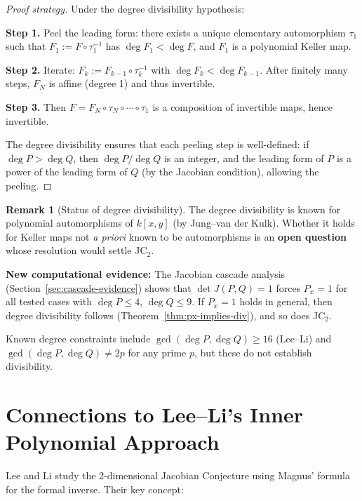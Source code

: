 \documentclass[12pt,a4paper]{article}
\theoremstyle{definition}
\newtheorem{remark}[theorem]{Remark}
\newcommand{\kk}{k}
\begin{document}
\begin{proof}[Proof strategy]
Under the degree divisibility hypothesis:

\textbf{Step 1.} Peel the leading form: there exists a unique elementary automorphism
$\tau_1$ such that $F_1 := F \circ \tau_1^{-1}$ has $\deg F_1 < \deg F$, and $F_1$
is a polynomial Keller map.

\textbf{Step 2.} Iterate: $F_k := F_{k-1} \circ \tau_k^{-1}$ with $\deg F_k < \deg F_{k-1}$.
After finitely many steps, $F_N$ is affine (degree 1) and thus invertible.

\textbf{Step 3.} Then $F = F_N \circ \tau_N \circ \cdots \circ \tau_1$ is a composition of
invertible maps, hence invertible.

\medskip
The degree divisibility ensures that each peeling step is well-defined: if $\deg P > \deg Q$,
then $\deg P / \deg Q$ is an integer, and the leading form of $P$ is a power of the leading
form of $Q$ (by the Jacobian condition), allowing the peeling.
\end{proof}

\begin{remark}[Status of degree divisibility]
The degree divisibility is known for polynomial automorphisms of $\kk[x,y]$ (by
Jung--van der Kulk). Whether it holds for Keller maps not \emph{a priori} known to
be automorphisms is an \textbf{open question} whose resolution would settle JC$_2$.

\textbf{New computational evidence:} The Jacobian cascade analysis
(Section~\ref{sec:cascade-evidence}) shows that $\det J(P,Q) = 1$ forces $P_x = 1$
for all tested cases with $\deg P \leq 4$, $\deg Q \leq 9$. If $P_x = 1$ holds in
general, then degree divisibility follows (Theorem~\ref{thm:px-implies-div}), and
so does JC$_2$.

Known degree constraints include $\gcd(\deg P, \deg Q) \geq 16$ (Lee--Li) and
$\gcd(\deg P, \deg Q) \neq 2p$ for any prime $p$, but these do not establish
divisibility.
\end{remark}

\section{Connections to Lee--Li's Inner Polynomial Approach}

Lee and Li \cite{LeeLi} study the 2-dimensional Jacobian Conjecture using Magnus' formula
for the formal inverse. Their key concept:
\end{document}

